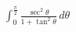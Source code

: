 \documentclass[preview]{standalone}
\begin{document}
\begin{align*}
\int_{0}^{\frac{\pi}{2}} \frac{\sec^2{\theta}}{1+\tan^2{\theta}} \, d\theta
\end{align*}
\end{document}
